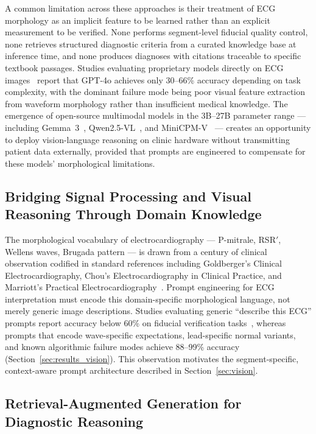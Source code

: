 \documentclass[journal,compsoc]{IEEEtran}
\begin{document}
A common limitation across these approaches is their treatment of ECG morphology as an implicit feature to be learned rather than an explicit measurement to be verified. None performs segment-level fiducial quality control, none retrieves structured diagnostic criteria from a curated knowledge base at inference time, and none produces diagnoses with citations traceable to specific textbook passages. Studies evaluating proprietary models directly on ECG images~\cite{seki2025ecg_vqa,lee2025ecg_mi,engelstein2025gpt4o_ecg} report that GPT-4o achieves only 30--66\% accuracy depending on task complexity, with the dominant failure mode being poor visual feature extraction from waveform morphology rather than insufficient medical knowledge. The emergence of open-source multimodal models in the 3B--27B parameter range --- including Gemma~3~\cite{gemma3_2025}, Qwen2.5-VL~\cite{qwen25vl2025}, and MiniCPM-V~\cite{minicpmv2024} --- creates an opportunity to deploy vision-language reasoning on clinic hardware without transmitting patient data externally, provided that prompts are engineered to compensate for these models' morphological limitations.

\subsection{Bridging Signal Processing and Visual Reasoning Through Domain Knowledge}

The morphological vocabulary of electrocardiography --- P-mitrale, RSR$'$, Wellens waves, Brugada pattern --- is drawn from a century of clinical observation codified in standard references including Goldberger's Clinical Electrocardiography, Chou's Electrocardiography in Clinical Practice, and Marriott's Practical Electrocardiography~\cite{goldberger2017clinical,marriott2019practical}. Prompt engineering for ECG interpretation must encode this domain-specific morphological language, not merely generic image descriptions. Studies evaluating generic ``describe this ECG'' prompts report accuracy below 60\% on fiducial verification tasks~\cite{li2026pulse,seki2025ecg_vqa}, whereas prompts that encode wave-specific expectations, lead-specific normal variants, and known algorithmic failure modes achieve 88--99\% accuracy (Section~\ref{sec:results_vision}). This observation motivates the segment-specific, context-aware prompt architecture described in Section~\ref{sec:vision}.
\subsection{Retrieval-Augmented Generation for Diagnostic Reasoning}
\end{document}
